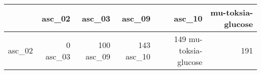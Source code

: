 \begin{tabular}{lrrrrr}
\toprule
 & asc_02 & asc_03 & asc_09 & asc_10 & mu-toksia-glucose \\
\midrule
asc_02 & 0%
asc_03 & 100%
asc_09 & 143%
asc_10 & 149%
mu-toksia-glucose & 191%
\bottomrule
\end{tabular}
